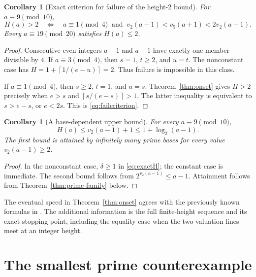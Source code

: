 \documentclass[11pt,letterpaper]{article}
\numberwithin{equation}{section}
\newtheorem{corollary}[theorem]{Corollary}
\theoremstyle{definition}
\theoremstyle{remark}
\newcommand{\ceil}[1]{\left\lceil #1\right\rceil}
\begin{document}
\begin{corollary}[Exact criterion for failure of the height-2 bound]\label{cor:criterion}
For $a\equiv9\pmod{10}$,
\begin{equation}\label{eq:failcriterion}
 H(a)>2
 \quad\Longleftrightarrow\quad
 a\equiv1\pmod4\ \text{ and }\ v_2(a-1)<v_5(a+1)<2v_2(a-1).
\end{equation}
Every $a\equiv19\pmod{20}$ satisfies $H(a)\le2$.
\end{corollary}
\begin{proof}
Consecutive even integers $a-1$ and $a+1$ have exactly one member divisible by $4$. If $a\equiv3\pmod4$, then $s=1$, $t\ge2$, and $u=t$. The nonconstant case has $H=1+\ceil{1/(e-u)}=2$. Thus failure is impossible in this class.

If $a\equiv1\pmod4$, then $s\ge2$, $t=1$, and $u=s$. Theorem~\ref{thm:onset} gives $H>2$ precisely when $e>s$ and $\ceil{s/(e-s)}>1$. The latter inequality is equivalent to $s>e-s$, or $e<2s$. This is \eqref{eq:failcriterion}.
\end{proof}

\begin{corollary}[A base-dependent upper bound]\label{cor:upperH}
For every $a\equiv9\pmod{10}$,
\[
 H(a)\le v_2(a-1)+1\le1+\log_2(a-1).
\]
The first bound is attained by infinitely many prime bases for every value $v_2(a-1)\ge2$.
\end{corollary}
\begin{proof}
In the nonconstant case, $\delta\ge1$ in \eqref{eq:exactH}; the constant case is immediate. The second bound follows from $2^{v_2(a-1)}\le a-1$. Attainment follows from Theorem~\ref{thm:prime-family} below.
\end{proof}

The eventual speed in Theorem~\ref{thm:onset} agrees with the previously known formulas in \cite{RipaOnnis2022}. The additional information is the full finite-height sequence and its exact stopping point, including the equality case when the two valuation lines meet at an integer height.

\section{The smallest prime counterexample}\label{sec:2749}
\end{document}
